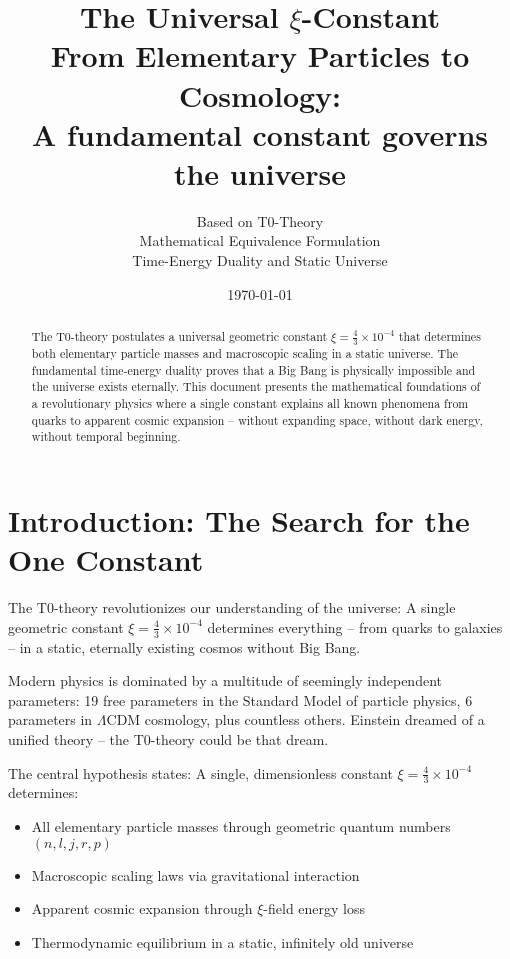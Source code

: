 \documentclass[12pt,a4paper]{article}
\title{\Huge\textbf{The Universal $\xi$-Constant}\\
	\Large From Elementary Particles to Cosmology: \\
	A fundamental constant governs the universe}
\author{Based on T0-Theory\\
	Mathematical Equivalence Formulation\\
	Time-Energy Duality and Static Universe}
\date{\today}
\newcommand{\xiconst}{\xi = \frac{4}{3} \times 10^{-4}}
\theoremstyle{definition}
\begin{document}
	
	\maketitle
	
	\begin{abstract}
		The T0-theory postulates a universal geometric constant $\xiconst$ that determines both elementary particle masses and macroscopic scaling in a static universe. The fundamental time-energy duality proves that a Big Bang is physically impossible and the universe exists eternally. This document presents the mathematical foundations of a revolutionary physics where a single constant explains all known phenomena from quarks to apparent cosmic expansion -- without expanding space, without dark energy, without temporal beginning.
	\end{abstract}
	
	\tableofcontents
	\newpage
	
	\section{Introduction: The Search for the One Constant}
	
	\begin{important}
		The T0-theory revolutionizes our understanding of the universe: A single geometric constant $\xiconst$ determines everything -- from quarks to galaxies -- in a static, eternally existing cosmos without Big Bang.
	\end{important}
	
	Modern physics is dominated by a multitude of seemingly independent parameters: 19 free parameters in the Standard Model of particle physics, 6 parameters in $\Lambda$CDM cosmology, plus countless others. Einstein dreamed of a unified theory -- the T0-theory could be that dream.
	
	The central hypothesis states: A single, dimensionless constant $\xiconst$ determines:
	\begin{itemize}
		\item All elementary particle masses through geometric quantum numbers $(n,l,j,r,p)$
		\item Macroscopic scaling laws via gravitational interaction
		\item Apparent cosmic expansion through $\xi$-field energy loss
		\item Thermodynamic equilibrium in a static, infinitely old universe
	\end{itemize}
	
\end{document}
